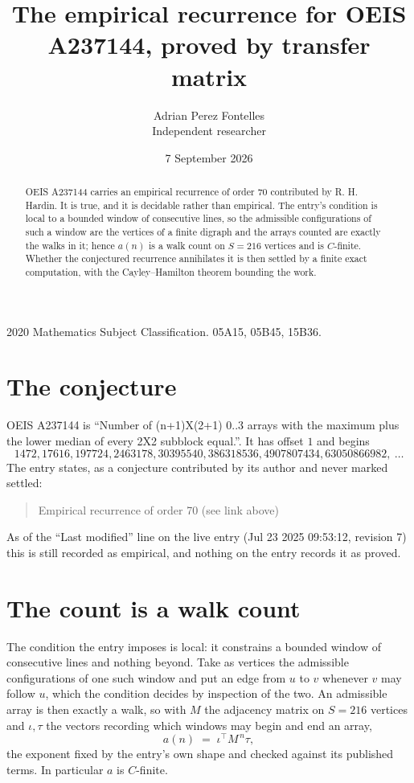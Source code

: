 \documentclass[11pt,a4paper]{article}
\title{The empirical recurrence for OEIS A237144, proved by transfer matrix}
\author{Adrian Perez Fontelles\\ \small Independent researcher}
\date{7 September 2026}
\theoremstyle{plain}
\theoremstyle{definition}
\begin{document}
\maketitle

\begin{abstract}
OEIS A237144 carries an empirical recurrence of order $70$ contributed by R. H. Hardin. It is
true, and it is decidable rather than empirical. The entry's condition is local to a bounded window of consecutive lines, so
the admissible configurations of such a window are the vertices of a finite digraph and the
arrays counted are exactly the walks in it; hence $a(n)$ is a walk count on $S=216$ vertices
and is $C$-finite. Whether the conjectured recurrence annihilates it is then settled by a
finite exact computation, with the Cayley--Hamilton theorem bounding the work.
\end{abstract}

\noindent\small 2020 Mathematics Subject Classification. 05A15, 05B45, 15B36.\normalsize

\section{The conjecture}

OEIS A237144 is ``Number of (n+1)X(2+1) 0..3 arrays with the maximum plus the lower median of every 2X2 subblock equal.''. It has offset $1$ and begins
\[
1472, 17616, 197724, 2463178, 30395540, 386318536, 4907807434, 63050866982,\ \dots
\]
The entry states, as a conjecture contributed by its author and never marked settled:
\begin{quote}
Empirical recurrence of order 70 (see link above)
\end{quote}
As of the ``Last modified'' line on the live entry (Jul 23 2025 09:53:12, revision 7) this is still
recorded as empirical, and nothing on the entry records it as proved.

\section{The count is a walk count}

The condition the entry imposes is local: it constrains a bounded window of consecutive lines and nothing beyond. Take as
vertices the admissible configurations of one such window and put an edge from $u$ to $v$
whenever $v$ may follow $u$, which the condition decides by inspection of the two. An
admissible array is then exactly a walk, so with $M$ the adjacency matrix on $S=216$ vertices
and $\iota,\tau$ the vectors recording which windows may begin and end an array,
\[
a(n)\;=\;\iota^{\!\top}M^{\,n}\tau ,
\]
the exponent fixed by the entry's own shape and checked against its published terms. In
particular $a$ is $C$-finite.
\end{document}
